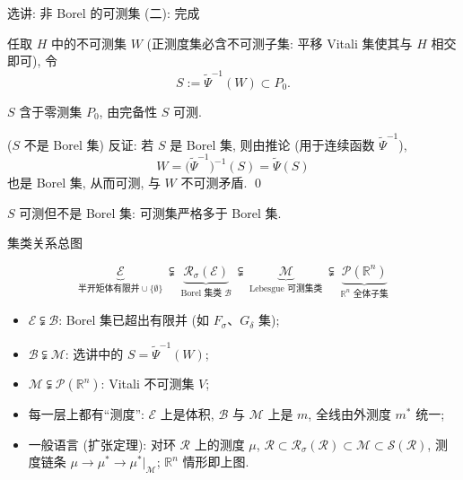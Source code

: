 
\begin{frame}{选讲: 非 Borel 的可测集 (二): 完成}

任取 $H$ 中的不可测集 $W$ (正测度集必含不可测子集: 平移 Vitali 集使其与 $H$ 相交即可), 令
\[
S := \widetilde{\Psi}^{-1}(W) \subset P_0 .
\]

\pause

$S$ 含于零测集 $P_0$, 由完备性 $S$ \alert{可测}.

\pause

\startproof[bg=yellow, fg=red]($S$ 不是 Borel 集)
反证: 若 $S$ 是 Borel 集, 则由推论 (用于连续函数 $\widetilde{\Psi}^{-1}$),
\[
W = \big(\widetilde{\Psi}^{-1}\big)^{-1}(S) = \widetilde{\Psi}(S)
\]
也是 Borel 集, 从而可测, 与 $W$ 不可测矛盾.
\qed

\pause

\begin{thm}
$S$ 可测但不是 Borel 集: \alert{可测集严格多于 Borel 集}.
\end{thm}

\end{frame}

\normalmode




\begin{frame}{集类关系总图}

\begin{center}
\[
\underbrace{\mathscr{E}}_{\text{半开矩体有限并} \cup \{\emptyset\}}
\ \subsetneqq\
\underbrace{\mathscr{R}_\sigma(\mathscr{E})}_{\text{Borel 集类 } \mathscr{B}}
\ \subsetneqq\
\underbrace{\mathscr{M}}_{\text{Lebesgue 可测集类}}
\ \subsetneqq\
\underbrace{\mathscr{P}(\mathbb{R}^n)}_{\mathbb{R}^n \text{ 全体子集}}
\]
\end{center}

\pause

\begin{itemize}
\item $\mathscr{E} \subsetneqq \mathscr{B}$: Borel 集已超出有限并 (如 $F_\sigma$、$G_\delta$ 集);
\item $\mathscr{B} \subsetneqq \mathscr{M}$: 选讲中的 $S = \widetilde{\Psi}^{-1}(W)$;
\item $\mathscr{M} \subsetneqq \mathscr{P}(\mathbb{R}^n)$: Vitali 不可测集 $V$;
\item 每一层上都有``测度'': $\mathscr{E}$ 上是体积, $\mathscr{B}$ 与 $\mathscr{M}$ 上是 $m$, 全线由外测度 $m^*$ 统一;
\item 一般语言 (扩张定理): 对环 $\mathscr{R}$ 上的测度 $\mu$, $\mathscr{R} \subset \mathscr{R}_\sigma(\mathscr{R}) \subset \mathscr{M} \subset \mathscr{S}(\mathscr{R})$, 测度链条 $\mu \longrightarrow \mu^* \longrightarrow \mu^*\big|_{\mathscr{M}}$; $\mathbb{R}^n$ 情形即上图.
\end{itemize}

\end{frame}

